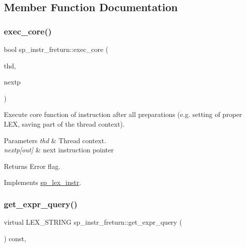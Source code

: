 \subsection{Member Function Documentation}
\mbox{\label{classsp__instr__freturn_a80fe2f90bc144b28a1a97dbff8b35e0b}} 
\subsubsection{\texorpdfstring{exec\+\_\+core()}{exec\_core()}}
{\footnotesize\ttfamily bool sp\+\_\+instr\+\_\+freturn\+::exec\+\_\+core (\begin{DoxyParamCaption}\item[{T\+HD $\ast$}]{thd,  }\item[{uint $\ast$}]{nextp }\end{DoxyParamCaption})\hspace{0.3cm}{\ttfamily [virtual]}}

Execute core function of instruction after all preparations (e.\+g. setting of proper L\+EX, saving part of the thread context).


\begin{DoxyParams}{Parameters}
{\em thd} & Thread context. \\
\hline
{\em nextp\mbox{[}out\mbox{]}} & next instruction pointer\\
\hline
\end{DoxyParams}
\begin{DoxyReturn}{Returns}
Error flag. 
\end{DoxyReturn}


Implements \mbox{\hyperlink{classsp__lex__instr_acab4e56f638f43101c11f838e1f9d395}{sp\+\_\+lex\+\_\+instr}}.

\mbox{\label{classsp__instr__freturn_adccc76ff6c7a1c0f72b58eda6e542e19}} 
\subsubsection{\texorpdfstring{get\+\_\+expr\+\_\+query()}{get\_expr\_query()}}
{\footnotesize\ttfamily virtual L\+E\+X\+\_\+\+S\+T\+R\+I\+NG sp\+\_\+instr\+\_\+freturn\+::get\+\_\+expr\+\_\+query (\begin{DoxyParamCaption}{ }\end{DoxyParamCaption}) const\hspace{0.3cm}{\ttfamily [inline]}, {\ttfamily [virtual]}}


